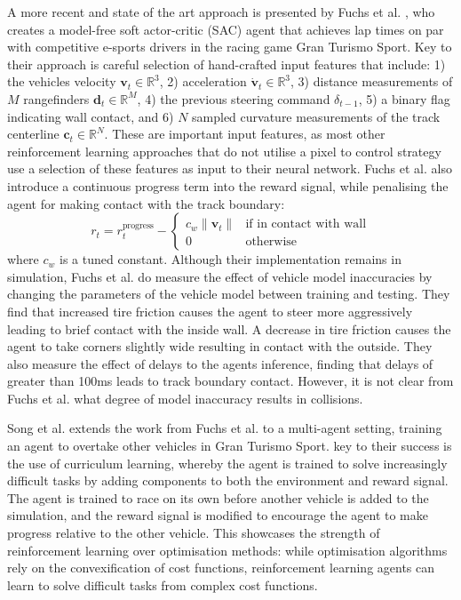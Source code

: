 A more recent and state of the art approach is presented by Fuchs et al. \cite{Fuchs2021}, who creates a model-free soft actor-critic (SAC) agent that achieves lap times on par with competitive e-sports drivers in the racing game Gran Turismo Sport.
Key to their approach is careful selection of hand-crafted input features that include: 1) the vehicles velocity $\pmb{v}_t \in \mathbb{R}^3$, 2) acceleration $\pmb{\dot{v}}_t \in \mathbb{R}^3$, 3) distance measurements of $M$ rangefinders $\pmb{d}_t \in \mathbb{R}^M$, 4) the previous steering command $\delta_{t-1}$, 5) a binary flag indicating wall contact, and 6) $N$ sampled curvature measurements of the track centerline $\pmb{c}_t \in \mathbb{R}^N$.
These are important input features, as most other reinforcement learning approaches that do not utilise a pixel to control strategy use a selection of these features as input to their neural network.
Fuchs et al. \cite{Fuchs2021} also introduce a continuous progress term into the reward signal, while penalising the agent for making contact with the track boundary:
\begin{equation}
    r_t = r_{t}^{\text{progress}} - 
    \begin{cases}
    c_w \| \pmb{v}_t \| & \text{if in contact with wall} \\
    0 & \text{otherwise}
    \end{cases}
\end{equation}
where $c_w$ is a tuned constant.
Although their implementation remains in simulation, Fuchs et al. \cite{Fuchs2021} do measure the effect of vehicle model inaccuracies by changing the parameters of the vehicle model between training and testing. They find that increased tire friction causes the agent to steer more aggressively leading to brief contact with the inside wall. A decrease in tire friction causes the agent to take corners slightly wide resulting in contact with the outside.
They also measure the effect of delays to the agents inference, finding that delays of greater than 100ms leads to track boundary contact. 
However, it is not clear from Fuchs et al. \cite{Fuchs2021} what degree of model inaccuracy results in collisions.


Song et al. \cite{Song2021} extends the work from Fuchs et al. \cite{Fuchs2021} to a multi-agent setting, training an agent to overtake other vehicles in Gran Turismo Sport.
key to their success is the use of curriculum learning, whereby the agent is trained to solve increasingly difficult tasks by adding components to both the environment and reward signal. 
The agent is trained to race on its own before another vehicle is added to the simulation, and the reward signal is modified to encourage the agent to make progress relative to the other vehicle.
This showcases the strength of reinforcement learning over optimisation methods: while optimisation algorithms rely on the convexification of cost functions, reinforcement learning agents can learn to solve difficult tasks from complex cost functions.


